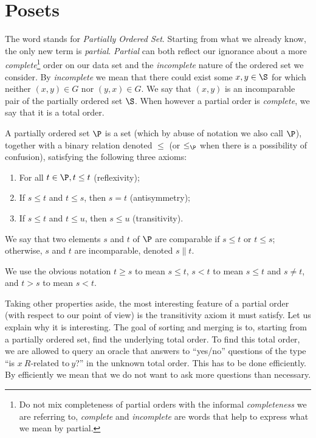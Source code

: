 \section{Posets}

The word  stands for \emph{Partially Ordered Set}. Starting from
what we already know, the only new term is \emph{partial}. \emph{Partial} can
both reflect our ignorance about a more
\emph{complete}\footnote{Do not mix completeness of partial orders with the informal
\emph{completeness} we are referring to, \emph{complete} and \emph{incomplete}
are words that help to express what we mean by partial.}
order on our data set
and the \emph{incomplete} nature of the ordered set we consider. By
\emph{incomplete} we mean that there could exist some $x, y \in \S$ for which
neither $(x, y) \in G$ nor $(y, x) \in G$. We say that $(x,y)$ is an
incomparable pair of the partially ordered set \(\S\). When however a partial
order is \emph{complete}, we say that it is a total order.
\begin{definition}
A partially ordered set $\P$ is a set (which by abuse of notation we also call
$\P$), together with a binary relation denoted $\leq$ (or $\leq_{\P}$ when there is
a possibility of confusion), satisfying the following three axioms:
\begin{enumerate}
\item For all $t \in \P, t \leq t$ (reflexivity);
\item If $s \leq t$ and $t \leq s$, then $s = t$ (antisymmetry);
\item If $s \leq t$ and $t \leq u$, then $s \leq u$ (transitivity).
\end{enumerate}

We say that two elements $s$ and $t$ of $\P$ are comparable if $s \leq t$ or $t
\leq s$; otherwise, $s$ and $t$ are incomparable, denoted $s \parallel t$.

We use the obvious notation $t \geq s$ to mean $s \leq t$, $s < t$ to mean $s
\leq t$ and $s \neq t$, and $t > s$ to mean $s < t$.
\end{definition}

Taking other properties aside, the most interesting feature of a partial order
(with respect to our point of view) is the transitivity axiom it must satisfy.
Let us explain why it is interesting. The goal of sorting and merging is to,
starting from a partially ordered set, find the underlying total order. To find
this total order, we are allowed to query an oracle that answers to ``yes/no''
questions of the type ``is $x~R\text{-related to}~y$?'' in the unknown total
order. This has to be done efficiently. By efficiently we mean that we do not
want to ask more questions than necessary.

